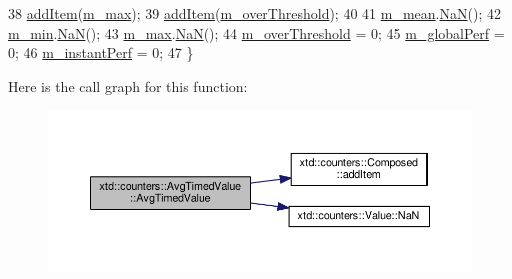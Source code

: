 \begin{DoxyCode}
38   \hyperlink{classxtd_1_1counters_1_1Composed_ac2efbce59510b352a2d47b3118e0d02a}{addItem}(\hyperlink{classxtd_1_1counters_1_1AvgTimedValue_a90ef2640c6d711a3eef2585aaef50afb}{m\_max});
39   \hyperlink{classxtd_1_1counters_1_1Composed_ac2efbce59510b352a2d47b3118e0d02a}{addItem}(\hyperlink{classxtd_1_1counters_1_1AvgTimedValue_a7a91ad83dade8f67c4df8150ddb33060}{m\_overThreshold});
40 
41   \hyperlink{classxtd_1_1counters_1_1AvgTimedValue_ab0eb52c60a1fe28c6ea148270ca8cc74}{m\_mean}.\hyperlink{classxtd_1_1counters_1_1Value_ab206db077ef38ac776a7e64774f56f2b}{NaN}();
42   \hyperlink{classxtd_1_1counters_1_1AvgTimedValue_aeed066e7062c73d577033308bc0344bf}{m\_min}.\hyperlink{classxtd_1_1counters_1_1Value_ab206db077ef38ac776a7e64774f56f2b}{NaN}();
43   \hyperlink{classxtd_1_1counters_1_1AvgTimedValue_a90ef2640c6d711a3eef2585aaef50afb}{m\_max}.\hyperlink{classxtd_1_1counters_1_1Value_ab206db077ef38ac776a7e64774f56f2b}{NaN}();
44   \hyperlink{classxtd_1_1counters_1_1AvgTimedValue_a7a91ad83dade8f67c4df8150ddb33060}{m\_overThreshold} = 0;
45   \hyperlink{classxtd_1_1counters_1_1AvgTimedValue_ad0b3148989210f269416e5af2169278e}{m\_globalPerf}    = 0;
46   \hyperlink{classxtd_1_1counters_1_1AvgTimedValue_a16f6336d72850b29aa10a97d72309ec4}{m\_instantPerf}   = 0;
47 \}
\end{DoxyCode}


Here is the call graph for this function\+:
\nopagebreak
\begin{figure}[H]
\begin{center}
\leavevmode
\includegraphics[width=350pt]{classxtd_1_1counters_1_1AvgTimedValue_a2c4e692d5e33a1155d7c869be55af0de_cgraph}
\end{center}
\end{figure}


